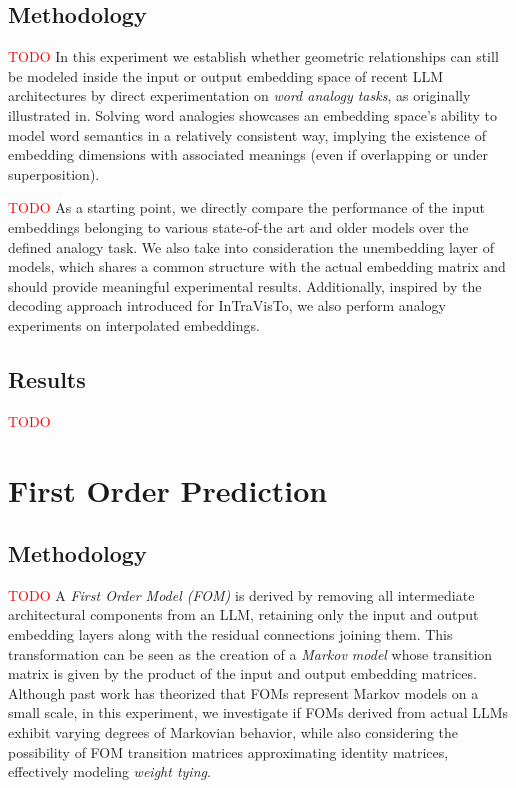 \documentclass[aspectratio=169, 12pt]{beamer}
\begin{document}
    \subsection{Methodology}
    \begin{frame}{}
        \textcolor{red}{TODO}
        In this experiment we establish whether geometric relationships can still be modeled inside the input or output embedding space of recent LLM architectures by direct experimentation on \emph{word analogy tasks}, as originally illustrated in.
        Solving word analogies showcases an embedding space's ability to model word semantics in a relatively consistent way, implying the existence of embedding dimensions with associated meanings (even if overlapping or under superposition).
    \end{frame}

    \begin{frame}{}
        \textcolor{red}{TODO}
        As a starting point, we directly compare the performance of the input embeddings belonging to various state-of-the art and older models over the defined analogy task.
        We also take into consideration the unembedding layer of models, which shares a common structure with the actual embedding matrix and should provide meaningful experimental results.
        Additionally, inspired by the decoding approach introduced for InTraVisTo, we also perform analogy experiments on interpolated embeddings.
    \end{frame}

    \subsection{Results}
    \begin{frame}{}
        \textcolor{red}{TODO}
    \end{frame}

    \section{First Order Prediction}

    \subsection{Methodology}
    \begin{frame}{}
        \textcolor{red}{TODO}
        A \emph{First Order Model (FOM)} is derived by removing all intermediate architectural components from an LLM, retaining only the input and output embedding layers along with the residual connections joining them.
        This transformation can be seen as the creation of a \emph{Markov model} whose transition matrix is given by the product of the input and output embedding matrices.
        Although past work has theorized that FOMs represent Markov models on a small scale, in this experiment, we investigate if FOMs derived from actual LLMs exhibit varying degrees of Markovian behavior, while also considering the possibility of FOM transition matrices approximating identity matrices, effectively modeling \emph{weight tying}.
    \end{frame}
\end{document}
